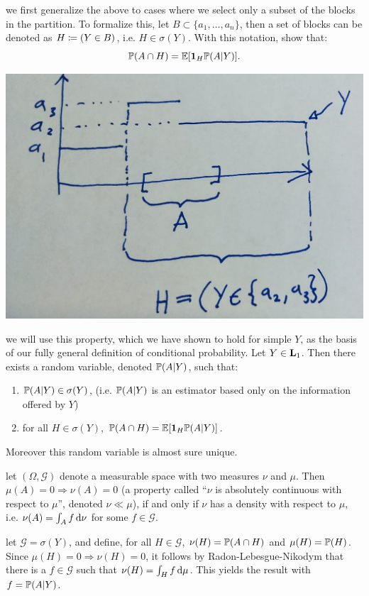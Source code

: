 \documentclass{article}
\begin{document}
 we first generalize the above to cases where we select only a subset of the blocks in the partition. To formalize this, let $B \subset \{a_1, \dots, a_n\}$, then a set of blocks can be denoted as $H \defeq (Y \in B)$, i.e. $H \in \sigma(Y)$. With this notation, show that:
\[ \P(A \cap H) = \E[ \1_H \P(A | Y)]. \]
\begin{center}
	\includegraphics[width=0.6\linewidth]{figures/law-of-total-pr} 
\end{center}

 we will use this property, which we have shown to hold for simple $Y$, as the basis of our fully general definition of conditional probability.  Let $Y \in \L_1$. Then there exists a random variable, denoted $\P(A|Y)$, such that:
\begin{enumerate}
  \item $\P(A|Y) \in \sigma(Y)$, (i.e. $\P(A|Y)$ is an estimator based only on the information offered by $Y$)
  \item for all $H \in \sigma(Y)$, $\P(A \cap H) = \E[ \1_H \P(A | Y)]$.
\end{enumerate} 
Moreover this random variable is almost sure unique.

\newcommand\othersigma{{\mathcal G}}

 let $(\Omega, \othersigma)$ denote a measurable space with two measures $\nu$ and $\mu$. Then $\mu(A) = 0 \Rightarrow \nu(A) = 0$ (a property called ``$\nu$ is absolutely continuous with respect to $\mu$'', denoted $\nu \ll \mu$), if and only if $\nu$ has a density with respect to $\mu$, i.e. $\nu(A) = \int_A f \ud \nu$ for some $f \in \othersigma$.

 let $\othersigma = \sigma(Y)$, and define, for all $H \in \othersigma$, $\nu(H) = \P(A \cap H)$ and $\mu(H) = \P(H)$. Since $\mu(H) = 0 \Longrightarrow \nu(H) = 0$, it follows by Radon-Lebesgue-Nikodym that there is a $f \in \othersigma$ such that $\nu(H) = \int_H f \ud \mu$. This yields the result with $f = \P(A|Y)$. 
\end{document}
